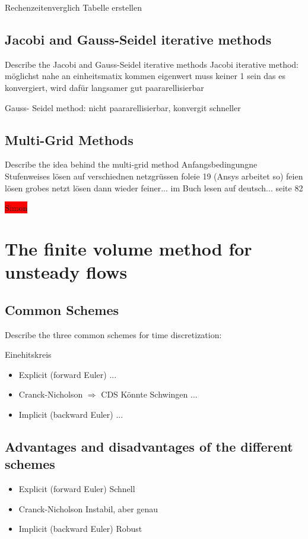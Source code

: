 \documentclass[a4paper]{scrartcl}
\begin{document}
Rechenzeitenverglich Tabelle erstellen

\subsection{Jacobi and Gauss-Seidel iterative methods}
Describe the Jacobi and Gauss-Seidel iterative methods
Jacobi iterative method: 
möglichst nahe an einheitsmatix kommen
eigenwert muss keiner 1 sein das es konvergiert, wird dafür langsamer 
gut paararellisierbar

Gauss- Seidel method: 
nicht paararellisierbar, konvergit schneller

\subsection{Multi-Grid Methods} 
Describe the idea behind the multi-grid method
Anfangsbedingungne 
Stufenweises lösen auf verschiednen netzgrüssen
foleie 19 (Ansys arbeitet so)
feien lösen
grobes netzt lösen
dann wieder feiner...
im Buch lesen auf deutsch... seite 82

\colorbox{red}{Simon}

\section{The finite volume method for unsteady flows}
\subsection{Common Schemes} Describe the three common schemes for time
discretization:

Einehitskreis 
\begin{itemize}
\item Explicit (forward Euler)
...

\item Cranck-Nicholson $\Rightarrow$ CDS
Könnte Schwingen
...

\item Implicit (backward Euler)
...

\end{itemize}
\subsection{Advantages and disadvantages of the different schemes}
\begin{itemize}
\item Explicit (forward Euler)
Schnell

\item Cranck-Nicholson
Instabil, aber genau

\item Implicit (backward Euler)
Robust 
\end{itemize}
\end{document}

